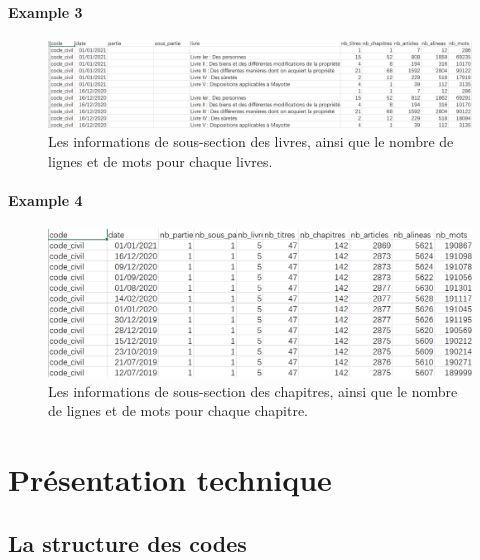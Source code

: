 \documentclass[
  oneside]{book}
\begin{document}
\hypertarget{example-3}{%
\paragraph{Example 3}\label{example-3}}

\begin{figure}

{\centering \includegraphics[width=0.8\linewidth]{images/stats3} 

}

\caption{Les informations de sous-section des livres, ainsi que le nombre de lignes et de mots pour chaque livres.}\label{fig:stats3}
\end{figure}

\hypertarget{example-4}{%
\paragraph{Example 4}\label{example-4}}

\begin{figure}

{\centering \includegraphics[width=0.8\linewidth]{images/stats6} 

}

\caption{Les informations de sous-section des chapitres, ainsi que le nombre de lignes et de mots pour chaque chapitre.}\label{fig:stats6}
\end{figure}

\hypertarget{pruxe9sentation-technique}{%
\section{Présentation technique}\label{pruxe9sentation-technique}}

\hypertarget{la-structure-des-codes}{%
\subsection{La structure des codes}\label{la-structure-des-codes}}
\end{document}

